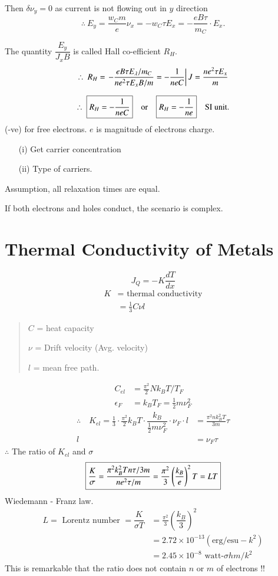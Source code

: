 Then $\delta \nu_{y}=0$ as current is not flowing out in $y$ direction
$$
\therefore \ E_{y}=\dfrac{w_{C}m}{e}\nu_{x}=-w_{C}\tau E_{x}=-\dfrac{eB\tau}{m_{C}}\cdot E_{x}.
$$

The quantity $\dfrac{E_{y}}{J_{x}B}$ is called Hall co-efficient $R_{H}$.
\begin{gather*}
\therefore \ R_{H} = \left. -\dfrac{eB\tau E_{\lambda}/m_{C}}{ne^{2}\tau E_{x}B/m}=-\dfrac{1}{neC}\right| J=\dfrac{ne^{2}\tau E_{x}}{m}\\[7pt]
\therefore \ \fbox{$R_{H}=-\dfrac{1}{neC}$}\quad\text{or}\quad \fbox{$R_{H}=-\dfrac{1}{ne}$}\quad \text{SI unit.}
\end{gather*}
(-ve) for free electrons. $e$ is magnitude of electrons charge.
\begin{itemize}
\item[(i)] Get carrier concentration

\item[(ii)] Type of carriers.
\end{itemize}
Assumption, all relaxation times are equal.

If both electrons and holes conduct, the scenario is complex.

\section*{Thermal Conductivity of Metals}
$$
J_{Q}=-K\dfrac{dT}{dx}
$$
\begin{align*}
K &= \text{ thermal conductivity}\\
 &= \frac{1}{3}C\nu l
\end{align*}
\begin{quote}
$C$ = heat capacity

$\nu$ = Drift velocity (Avg. velocity)

$l$ = mean free path.
\end{quote}
\begin{align*}
C_{el} &= \frac{\pi^{2}}{2}Nk_{B}T/T_{F}\\
\epsilon_{F} &= k_{B}T_{F}=\frac{1}{2}m\nu^{2}_{F}
\end{align*}
\begin{align*}
\therefore\quad K_{el}=\frac{1}{3}\cdot \frac{\pi^{2}}{2}k_{B}T\cdot \dfrac{k_{B}}{\frac{1}{2}m\nu^{2}_{F}}\cdot \nu_{F}\cdot l &= \frac{\pi^{2}nk^{2}_{B}T}{3m}\tau\\
l &= \nu_{F}\tau
\end{align*}
$\therefore$ The ratio of $K_{el}$ and $\sigma$
$$
\fbox{$\dfrac{K}{\sigma}=\dfrac{\pi^{2}k^{2}_{B}Tn\tau/3m}{ne^{2}\tau/m}=\dfrac{\pi^{2}}{3}\left(\dfrac{k_{B}}{e}\right)^{2}T=LT$}
$$
Wiedemann - Franz law.
\begin{align*}
L = \text{ Lorentz number } =\dfrac{K}{\sigma T} &= \frac{\pi^{2}}{3}\left(\dfrac{k_{B}}{3}\right)^{2}\\
&= 2.72\times 10^{-13}(\text{erg}/\text{esu}-k^{2})\\
&= 2.45\times 10^{-8}\text{ watt-}\sigma hm/k^{2}
\end{align*}
This is remarkable that the ratio does not contain $n$ or $m$ of electrons !!

